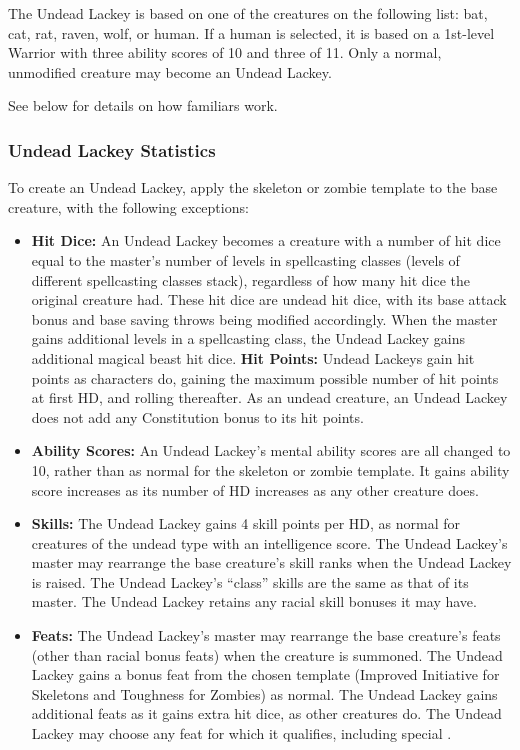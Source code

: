 The Undead Lackey is based on one of the creatures on the following list: bat, cat, rat, raven, wolf, or human. If a human is selected, it is based on a 1st-level Warrior with three ability scores of 10 and three of 11.
Only a normal, unmodified creature may become an Undead Lackey.

See below for details on how familiars work.
\subsubsection{Undead Lackey Statistics}
To create an Undead Lackey, apply the skeleton or zombie template to the base creature, with the following exceptions:
\begin{itemize}
 \item \textbf{Hit Dice:} An Undead Lackey becomes a creature with a number of hit dice equal to the master's number of levels in spellcasting classes (levels of different spellcasting classes stack), 
 regardless of how many hit dice the original creature had. These hit dice are undead hit dice, with its base attack bonus and base saving throws being modified accordingly.
 When the master gains additional levels in a spellcasting class, the Undead Lackey gains additional magical beast hit dice.
 \subitem \textbf{Hit Points:} Undead Lackeys gain hit points as characters do, gaining the maximum possible number of hit points at first HD, 
 and rolling thereafter. As an undead creature, an Undead Lackey does not add any Constitution bonus to its hit points.
 \item \textbf{Ability Scores:} An Undead Lackey's mental ability scores are all changed to 10, rather than as normal for the skeleton or zombie template.
 It gains ability score increases as its number of HD increases as any other creature does.
 \item \textbf{Skills:} The Undead Lackey gains 4 skill points per HD, as normal for creatures of the undead type with an intelligence score. The Undead Lackey's master may rearrange the base creature's skill ranks when the Undead Lackey is raised. 
 The Undead Lackey's ``class'' skills are the same as that of its master. The Undead Lackey retains any racial skill bonuses it may have.
 \item \textbf{Feats:} The Undead Lackey's master may rearrange the base creature's feats (other than racial bonus feats) when the creature is summoned. The Undead Lackey gains a bonus feat from the chosen template (Improved Initiative for Skeletons and Toughness for Zombies) as normal.
 The Undead Lackey gains additional feats as it gains extra hit dice, as other creatures do. The Undead Lackey may choose any feat for which it qualifies, including special .
\end{itemize}

